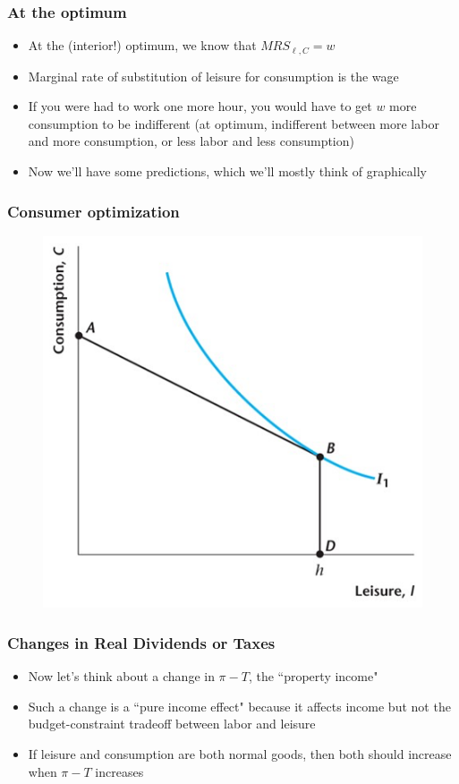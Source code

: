 \documentclass{beamer}
\begin{document}
\begin{frame}
\frametitle[alignment=center]{At the optimum}
\begin{itemize}
\item At the (interior!) optimum, we know that $MRS_{\ell,C}=w$
\bigskip
\item Marginal rate of substitution of leisure for consumption is the wage
\bigskip
\item If you were had to work one more hour, you would have to get $w$ more consumption to be indifferent (at optimum, indifferent between more labor and more consumption, or less labor and less consumption)
\bigskip
\item Now we'll have some predictions, which we'll mostly think of graphically
\end{itemize}
\end{frame}

\begin{frame}
\frametitle[alignment=center]{Consumer optimization}
\begin{figure}
\centering
\includegraphics[scale=0.5]{Figures/W_Fig_4pt6.png}
\end{figure}
\end{frame}


\begin{frame}
\frametitle[alignment=center]{Changes in Real Dividends or Taxes}
\begin{itemize}
\item Now let's think about a change in $\pi-T$, the ``property income"
\bigskip
\item Such a change is a ``pure income effect" because it affects income but not the budget-constraint tradeoff between labor and leisure
\bigskip
\item If leisure and consumption are both normal goods, then both should increase when $\pi-T$ increases
\end{itemize}
\end{frame}
\end{document}
